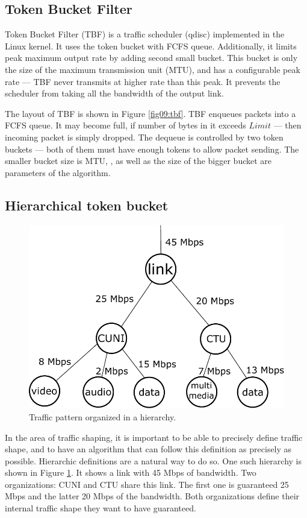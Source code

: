 \subsection{Token Bucket Filter}
Token Bucket Filter (TBF) is a traffic scheduler (qdisc) implemented in the Linux kernel. It uses the token bucket with FCFS queue. Additionally, it limits peak maximum output rate by adding second small bucket. This bucket is only the size of the maximum transmission unit (MTU), and has a configurable peak rate --- TBF never transmits at higher rate than this peak. It prevents the scheduler from taking all the bandwidth of the output link.

The layout of TBF is shown in Figure \ref{fig09:tbf}. TBF enqueues packets into a FCFS queue. It may become full, if number of bytes in it exceeds $Limit$ --- then incoming packet is simply dropped. The dequeue is controlled by two token buckets --- both of them must have enough tokens to allow packet sending. The smaller bucket size is MTU, ,  as well as the size of the bigger bucket  are parameters of the algorithm.

\subsection{Hierarchical token bucket}
\begin{figure}
	\centering
	\includegraphics[width=.8\linewidth]{drawings/hierarchy}
	\caption{Traffic pattern organized in a hierarchy.}
	
	\label{fig10:hierarchy}
\end{figure}
In the area of traffic shaping, it is important to be able to precisely define traffic shape, and to have an algorithm that can follow this definition as precisely as possible. Hierarchic definitions are a natural way to do so. One such hierarchy is shown in Figure \ref{fig10:hierarchy}. It shows a link with 45 Mbps of bandwidth. Two organizations: CUNI and CTU share this link. The first one is guaranteed 25 Mbps and the latter 20 Mbps of the bandwidth. Both organizations define their internal traffic shape they want to have guaranteed.

